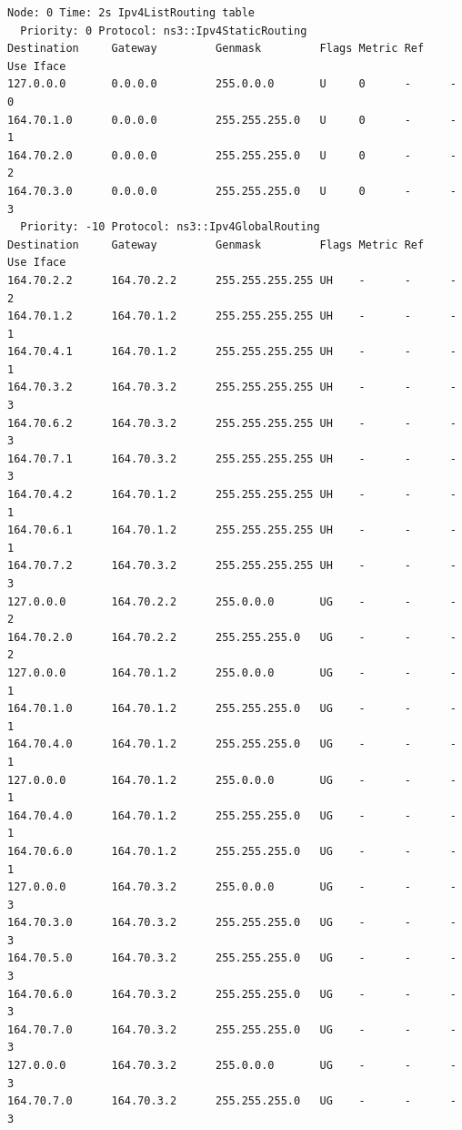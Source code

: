 \documentclass[a4paper,12pt, Projekat]{etf}
\begin{document}
\begin{itemize}
\begin{verbatim}
Node: 0 Time: 2s Ipv4ListRouting table
  Priority: 0 Protocol: ns3::Ipv4StaticRouting
Destination     Gateway         Genmask         Flags Metric Ref    Use Iface
127.0.0.0       0.0.0.0         255.0.0.0       U     0      -      -   0
164.70.1.0      0.0.0.0         255.255.255.0   U     0      -      -   1
164.70.2.0      0.0.0.0         255.255.255.0   U     0      -      -   2
164.70.3.0      0.0.0.0         255.255.255.0   U     0      -      -   3
  Priority: -10 Protocol: ns3::Ipv4GlobalRouting
Destination     Gateway         Genmask         Flags Metric Ref    Use Iface
164.70.2.2      164.70.2.2      255.255.255.255 UH    -      -      -   2
164.70.1.2      164.70.1.2      255.255.255.255 UH    -      -      -   1
164.70.4.1      164.70.1.2      255.255.255.255 UH    -      -      -   1
164.70.3.2      164.70.3.2      255.255.255.255 UH    -      -      -   3
164.70.6.2      164.70.3.2      255.255.255.255 UH    -      -      -   3
164.70.7.1      164.70.3.2      255.255.255.255 UH    -      -      -   3
164.70.4.2      164.70.1.2      255.255.255.255 UH    -      -      -   1
164.70.6.1      164.70.1.2      255.255.255.255 UH    -      -      -   1
164.70.7.2      164.70.3.2      255.255.255.255 UH    -      -      -   3
127.0.0.0       164.70.2.2      255.0.0.0       UG    -      -      -   2
164.70.2.0      164.70.2.2      255.255.255.0   UG    -      -      -   2
127.0.0.0       164.70.1.2      255.0.0.0       UG    -      -      -   1
164.70.1.0      164.70.1.2      255.255.255.0   UG    -      -      -   1
164.70.4.0      164.70.1.2      255.255.255.0   UG    -      -      -   1
127.0.0.0       164.70.1.2      255.0.0.0       UG    -      -      -   1
164.70.4.0      164.70.1.2      255.255.255.0   UG    -      -      -   1
164.70.6.0      164.70.1.2      255.255.255.0   UG    -      -      -   1
127.0.0.0       164.70.3.2      255.0.0.0       UG    -      -      -   3
164.70.3.0      164.70.3.2      255.255.255.0   UG    -      -      -   3
164.70.5.0      164.70.3.2      255.255.255.0   UG    -      -      -   3
164.70.6.0      164.70.3.2      255.255.255.0   UG    -      -      -   3
164.70.7.0      164.70.3.2      255.255.255.0   UG    -      -      -   3
127.0.0.0       164.70.3.2      255.0.0.0       UG    -      -      -   3
164.70.7.0      164.70.3.2      255.255.255.0   UG    -      -      -   3


\end{verbatim}
\end{itemize}
\end{document}
